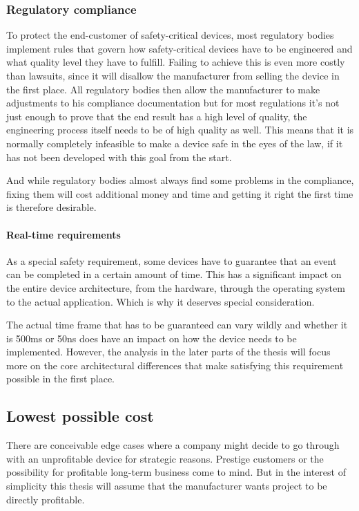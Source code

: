 \subsubsection{Regulatory compliance}
To protect the end-customer of safety-critical devices, most regulatory bodies implement rules that govern how safety-critical devices have to be engineered and what quality level they have to fulfill.
Failing to achieve this is even more costly than lawsuits, since it will disallow the manufacturer from selling the device in the first place. All regulatory bodies then allow the manufacturer to make adjustments to his compliance documentation but for most regulations it’s not just enough to prove that the end result has a high level of quality, the engineering process itself needs to be of high quality as well. This means that it is normally completely infeasible to make a device safe in the eyes of the law, if it has not been developed with this goal from the start. 

And while regulatory bodies almost always find some problems in the compliance, fixing them will cost additional money and time and getting it right the first time is therefore desirable.

\paragraph{Real-time requirements}
As a special safety requirement, some devices have to guarantee that an event can be completed in a certain amount of time. This has a significant impact on the entire device architecture, from the hardware, through the operating system to the actual application. Which is why it deserves special consideration.

The actual time frame that has to be guaranteed can vary wildly and whether it is 500ms or 50ns does have an impact on how the device needs to be implemented. However, the analysis in the later parts of the thesis will focus more on the core architectural differences that make satisfying this requirement possible in the first place. 

\subsection{Lowest possible cost}
There are conceivable edge cases where a company might decide to go through with an unprofitable device for strategic reasons. Prestige customers or the possibility for profitable long-term business come to  mind. But in the interest of simplicity this thesis will assume that the manufacturer wants project to be directly profitable.

